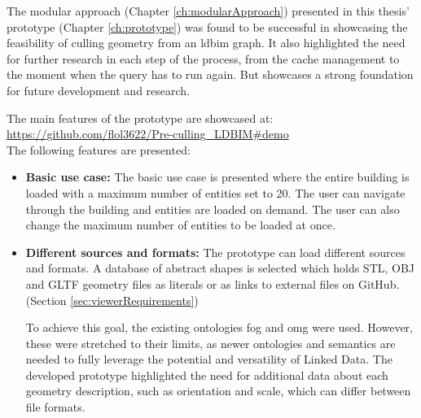 The modular approach (Chapter \ref{ch:modularApproach}) presented in this thesis' prototype (Chapter \ref{ch:prototype}) was found to be successful in showcasing the feasibility of culling geometry from an \ac{ldbim} graph. It also highlighted the need for further research in each step of the process, from the cache management to the moment when the query has to run again. But showcases a strong foundation for future development and research.

\newpage
The main features of the prototype are showcased at:\\
\url{https://github.com/flol3622/Pre-culling_LDBIM#demo}\\
The following features are presented:

\begin{itemize}
    \item \textbf{Basic use case:} The basic use case is presented where the entire building is loaded with a maximum number of entities set to 20. The user can navigate through the building and entities are loaded on demand. The user can also change the maximum number of entities to be loaded at once.
    \item \textbf{Different sources and formats:} The prototype can load different sources and formats. A database of abstract shapes is selected which holds STL, OBJ and GLTF geometry files as literals or as links to external files on GitHub. (Section \ref{sec:viewerRequirements})
    
    To achieve this goal, the existing ontologies \ac{fog} and \ac{omg} were used. However, these were stretched to their limits, as newer ontologies and semantics are needed to fully leverage the potential and versatility of Linked Data. The developed prototype highlighted the need for additional data about each geometry description, such as orientation and scale, which can differ between file formats.


\end{itemize}

